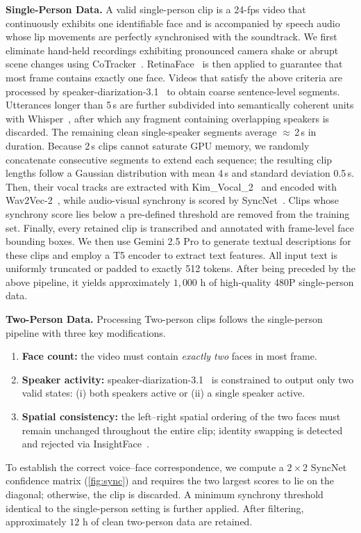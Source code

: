 \noindent \textbf{Single-Person Data.}
A valid single-person clip is a 24-fps video that continuously exhibits one identifiable face and is accompanied by speech audio whose lip movements are perfectly synchronised with the soundtrack.
We first eliminate hand-held recordings exhibiting pronounced camera shake or abrupt scene changes using CoTracker~\cite{karaev2024cotracker}.
RetinaFace~\cite{deng2020retinaface} is then applied to guarantee that most frame contains exactly one face.
Videos that satisfy the above criteria are processed by speaker-diarization-3.1~\cite{Plaquet23} to obtain coarse sentence-level segments.
Utterances longer than 5\,s are further subdivided into semantically coherent units with Whisper~\cite{radford2023robust}, after which any fragment containing overlapping speakers is discarded.
The remaining clean single-speaker segments average $\approx$\,2\,s in duration.
Because 2\,s clips cannot saturate GPU memory, we randomly concatenate consecutive segments to extend each sequence; the resulting clip lengths follow a Gaussian distribution with mean 4\,s and standard deviation 0.5\,s.
Then, their vocal tracks are extracted with Kim\_Vocal\_2~\cite{takahashi2017multi} and encoded with Wav2Vec-2~\cite{schneider2019wav2vec}, while audio-visual synchrony is scored by SyncNet~\cite{li2024latentsync}.
Clips whose synchrony score lies below a pre-defined threshold are removed from the training set.
Finally, every retained clip is transcribed and annotated with frame-level face bounding boxes.
We then use Gemini 2.5 Pro to generate textual descriptions for these clips and employ a T5 encoder to extract text features.
All input text is uniformly truncated or padded to exactly 512 tokens.
After being preceded by the above pipeline, it yields approximately $1,000$ h of high-quality 480P single-person data.


\noindent \textbf{Two-Person Data.}
Processing Two-person clips follows the single-person pipeline with three key modifications.
\begin{enumerate}[leftmargin=*,nosep]
  \item \textbf{Face count:} the video must contain \emph{exactly two} faces in most frame.
  \item \textbf{Speaker activity:} speaker-diarization-3.1~\cite{Plaquet23} is constrained to output only two valid states: (i) both speakers active or (ii) a single speaker active. 
  \item \textbf{Spatial consistency:} the left--right spatial ordering of the two faces must remain unchanged throughout the entire clip; identity swapping is detected and rejected via InsightFace~\cite{deng2020retinaface}.
\end{enumerate}
To establish the correct voice--face correspondence, we compute a $2\!\times\!2$ SyncNet confidence matrix (\cref{fig:sync}) and requires the two largest scores to lie on the diagonal; otherwise, the clip is discarded.
A minimum synchrony threshold identical to the single-person setting is further applied.
After filtering, approximately $12$ h of clean two-person data are retained.

